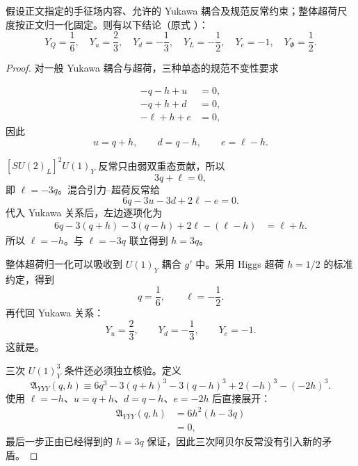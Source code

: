 \begin{proposition}[超荷线性与立方约束的解]
假设正文指定的手征场内容、允许的 Yukawa 耦合及规范反常约束；整体超荷尺度按正文归一化固定。则有以下结论（原式 ）：
\begin{equation*}
 \boxed{
 Y_Q=\frac16,\quad Y_u=\frac23,\quad Y_d=-\frac13,\quad
 Y_L=-\frac12,\quad Y_e=-1,\quad Y_\Phi=\frac12.}
\end{equation*}
\end{proposition}
\begin{proof}
对一般 Yukawa 耦合与超荷，三种单态的规范不变性要求

\begin{align*}
 -q-h+u&=0,\\
 -q+h+d&=0,\\
 -\ell+h+e&=0,
\end{align*}
因此
\begin{equation*}
 u=q+h,\qquad d=q-h,\qquad e=\ell-h.
\end{equation*}

$[SU(2)_L]^2U(1)_Y$ 反常只由弱双重态贡献，所以
\begin{equation*}
 3q+\ell=0,
\end{equation*}
即 $\ell=-3q$。混合引力--超荷反常给
\begin{equation*}
 6q-3u-3d+2\ell-e=0.
\end{equation*}
代入 Yukawa 关系后，左边逐项化为
\begin{align*}
 6q-3(q+h)-3(q-h)+2\ell-(\ell-h)
 &=\ell+h.
\end{align*}
所以 $\ell=-h$。与 $\ell=-3q$ 联立得到 $h=3q$。

整体超荷归一化可以吸收到 $U(1)_Y$ 耦合 $g'$ 中。采用 Higgs 超荷 $h=1/2$ 的标准约定，得到
\begin{equation*}
 q=\frac16,\qquad \ell=-\frac12.
\end{equation*}
再代回 Yukawa 关系：
\begin{equation*}
 Y_u=\frac23,\qquad
 Y_d=-\frac13,\qquad
 Y_e=-1.
\end{equation*}
这就是。

三次 $U(1)_Y^3$ 条件还必须独立核验。定义
\begin{equation*}
 \mathfrak A_{YYY}(q,h)
 \equiv
 6q^3-3(q+h)^3-3(q-h)^3+2(-h)^3-(-2h)^3.
\end{equation*}
使用 $\ell=-h$、$u=q+h$、$d=q-h$、$e=-2h$ 后直接展开：
\begin{align*}
 \mathfrak A_{YYY}(q,h)
 &=6h^2(h-3q)\\
 &=0,
\end{align*}
最后一步正由已经得到的 $h=3q$ 保证，因此三次阿贝尔反常没有引入新的矛盾。
\end{proof}

